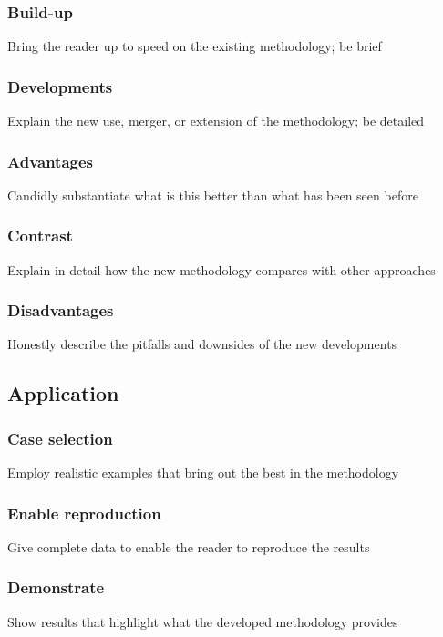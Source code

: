 \documentclass{ICASP13Paper}
\begin{document}
\subsubsection{Build-up}
Bring the reader up to speed on the existing methodology; be brief

\subsubsection{Developments}
Explain the new use, merger, or extension of the methodology; be detailed

\subsubsection{Advantages}
Candidly substantiate what is this better than what has been seen before

\subsubsection{Contrast}
Explain in detail how the new methodology compares with other approaches

\subsubsection{Disadvantages}
Honestly describe the pitfalls and downsides of the new developments

\subsection{Application}

\subsubsection{Case selection}
Employ realistic examples that bring out the best in the methodology

\subsubsection{Enable reproduction}
Give complete data to enable the reader to reproduce the results

\subsubsection{Demonstrate}
Show results that highlight what the developed methodology provides
\end{document}

